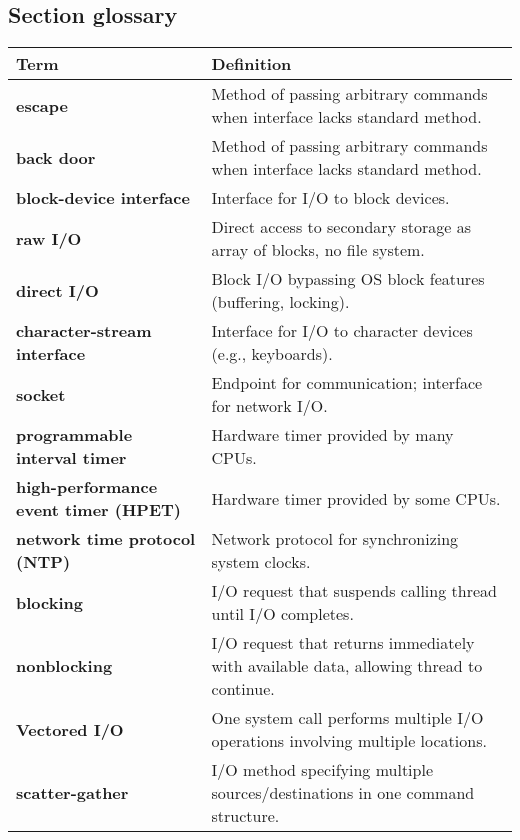 \subsection{Section glossary}
\begin{tabular}{p{}p{}}
    \toprule
    \textbf{Term} & \textbf{Definition} \\
    \midrule
    \textbf{escape} & Method of passing arbitrary commands when interface lacks standard method. \\
    \textbf{back door} & Method of passing arbitrary commands when interface lacks standard method. \\
    \textbf{block-device interface} & Interface for I/O to block devices. \\
    \textbf{raw I/O} & Direct access to secondary storage as array of blocks, no file system. \\
    \textbf{direct I/O} & Block I/O bypassing OS block features (buffering, locking). \\
    \textbf{character-stream interface} & Interface for I/O to character devices (e.g., keyboards). \\
    \textbf{socket} & Endpoint for communication; interface for network I/O. \\
    \textbf{programmable interval timer} & Hardware timer provided by many CPUs. \\
    \textbf{high-performance event timer (HPET)} & Hardware timer provided by some CPUs. \\
    \textbf{network time protocol (NTP)} & Network protocol for synchronizing system clocks. \\
    \textbf{blocking} & I/O request that suspends calling thread until I/O completes. \\
    \textbf{nonblocking} & I/O request that returns immediately with available data, allowing thread to continue. \\
    \textbf{Vectored I/O} & One system call performs multiple I/O operations involving multiple locations. \\
    \textbf{scatter-gather} & I/O method specifying multiple sources/destinations in one command structure. \\
    \bottomrule
\end{tabular}
